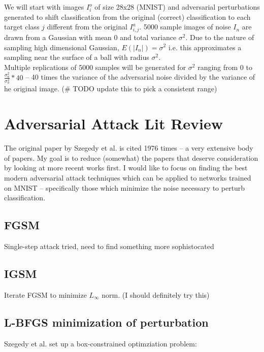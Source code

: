 \documentclass[10pt]{extarticle}\usepackage[letterpaper]{geometry}
\begin{document}
We will start with images $I_i^o$ of size 28x28 (MNIST) and adversarial
perturbations generated to shift classification from the original (correct)
classification to each target class $j$  different from the original
$I_{i,j}^a$.   
5000 sample images of noise $I_n$ are  drawn from a Gaussian with
mean 0 
and total variance $\sigma^2$. Due to the nature of sampling high
dimensional Gaussian, $E(|I_n|) = \sigma^2$ i.e. this approximates a
sampling near the surface of a ball with radius $\sigma^2$. \\

Multiple replications of 5000 samples will be generated for $\sigma^2$
ranging from 0 to $\frac{\sigma_a^2}{\sigma_o^2}*40$ -- 40 times the
variance of the adversarial noise divided by the variance of he
original image. (\# TODO update this to pick a consistent range)

\section{Adversarial Attack Lit Review}

The original paper by Szegedy et al. \cite{szegedy2013} is cited 1976 times -- a very extensive body of papers. My goal is to reduce (somewhat) the papers that deserve consideration by looking at more recent works first. I would like to focus on finding the best modern adversarial attack techniques which can be applied to networks trained on MNIST -- specifically those which minimize the noise necessary to perturb classification.

\subsection{FGSM}

Single-step attack tried, need to find something more sophistocated

\subsection{IGSM}

Iterate FGSM to minimize $L_\infty$ norm. (I should definitely try this)

\cite{kurakin_adversarial_2016}

\subsection{L-BFGS minimization of perturbation}
Szegedy et al. set up a box-constrained optimziation problem:
\end{document}
